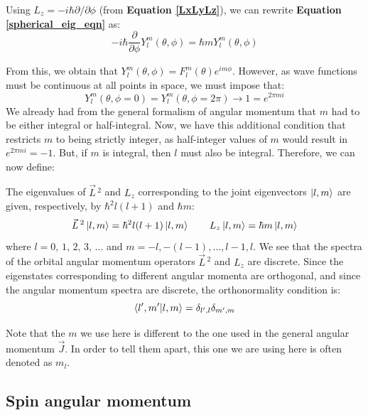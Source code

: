 Using $L_z = -i\hbar \partial /\partial\phi$ (from \textbf{Equation \ref{LxLyLz}}), we can rewrite \textbf{Equation \ref{spherical_eig_eqn}} as:
\begin{equation}
    -i\hbar \frac{\partial}{\partial\phi}Y_l^m(\theta, \phi) = \hbar mY_l^m(\theta, \phi)
\end{equation}

From this, we obtain that $Y_l^m(\theta, \phi) = F_l^m(\theta) e^{im\phi}$. However, as wave functions must be continuous at all points in space, we must impose that:
\begin{equation}
    Y_l^m(\theta, \phi=0) = Y_l^m(\theta, \phi=2\pi) \longrightarrow 1 = e^{2\pi mi}
\end{equation}
We already had from the general formalism of angular momentum that $m$ had to be either integral or half-integral. Now, we have this additional condition that restricts $m$ to being strictly integer, as half-integer values of $m$ would result in $e^{2\pi mi}=-1$. But, if $m$ is integral, then $l$ must also be integral. Therefore, we can now define:

\begin{definition}
    The eigenvalues of $\vec{L}\,^2$ and $L_z$ corresponding to the joint eigenvectors $\ket{l,m}$ are given, respectively, by $\hbar^2l(l+1)$ and $\hbar m$:
    \begin{equation}
        \vec{L}\,^2\ket{l,m} = \hbar^2l(l+1)\ket{l,m}\qquad L_z\ket{l,m} = \hbar m\ket{l,m}
    \end{equation}
    where $l = 0,\, 1,\, 2,\, 3,\, ...$ and $m = -l, -(l-1), \dots, l-1, l$. We see that the spectra of the orbital angular momentum operators $\vec{L}\,^2$ and $L_z$ are discrete. Since the eigenstates corresponding to different angular momenta are orthogonal, and since the angular momentum spectra are discrete, the orthonormality condition is:
    \begin{equation}
        \braket{l',m'|l,m} = \delta_{l',l}\delta_{m',m}
    \end{equation}

    Note that the $m$ we use here is different to the one used in the general angular momentum $\vec{J}$. In order to tell them apart, this one we are using here is often denoted as $m_l$.
\end{definition}

\subsection{Spin angular momentum} \label{spin}

